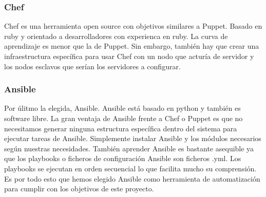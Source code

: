 	\subsubsection{Chef}
	\begin{text}
		Chef es una herramienta open source con objetivos similares a Puppet. Basado en ruby y orientado a desarrolladores con experienca en ruby. La curva de aprendizaje es menor que la de Puppet. Sin embargo, también hay que crear una infraestructura específica para usar Chef con un nodo que acturía de servidor y los nodos esclavos que serían los servidores a configurar.
	\end{text}
	\subsubsection{Ansible}
	\begin{text}
		Por úlitmo la elegida, Ansible. Ansible está basado en python y también es software libre. La gran ventaja de Ansible frente a Chef o Puppet es que no necesitamos generar ninguna estructura específica dentro del sistema para ejecutar tareas de Ansible. Simplemente instalar Ansible y los módulos necesarios según nuestras necesidades. También aprender Ansible es bastante asequible ya que los playbooks o ficheros de configuración Ansible son ficheros .yml. Los playbooks se ejecutan en orden secuencial lo que facilita mucho su comprensión. Es por todo esto que hemos elegido Ansible como herramienta de automatización para cumplir con los objetivos de este proyecto.
	\end{text}
	

